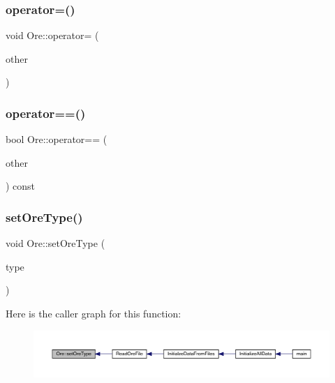 \mbox{\label{class_ore_ab7fc14ea7982fa6a40c8f5408899bfba}} 
\subsubsection{\texorpdfstring{operator=()}{operator=()}}
{\footnotesize\ttfamily void Ore\+::operator= (\begin{DoxyParamCaption}\item[{const \mbox{\hyperlink{class_ore}{Ore}} \&}]{other }\end{DoxyParamCaption})}

\mbox{\label{class_ore_a1264f907e235e2fd60e0c6ba5f7778dd}} 
\subsubsection{\texorpdfstring{operator==()}{operator==()}}
{\footnotesize\ttfamily bool Ore\+::operator== (\begin{DoxyParamCaption}\item[{const \mbox{\hyperlink{class_ore}{Ore}} \&}]{other }\end{DoxyParamCaption}) const}

\mbox{\label{class_ore_a7d463e3c3da27da5a4e645c8ea062251}} 
\subsubsection{\texorpdfstring{set\+Ore\+Type()}{setOreType()}}
{\footnotesize\ttfamily void Ore\+::set\+Ore\+Type (\begin{DoxyParamCaption}\item[{\mbox{\hyperlink{_ore_8hpp_a4dd6f8b19eecee73049dd69be5803f14}{En\+Ore\+Type}}}]{type }\end{DoxyParamCaption})}

Here is the caller graph for this function\+:
\nopagebreak
\begin{figure}[H]
\begin{center}
\leavevmode
\includegraphics[width=350pt]{d7/d51/class_ore_a7d463e3c3da27da5a4e645c8ea062251_icgraph}
\end{center}
\end{figure}



